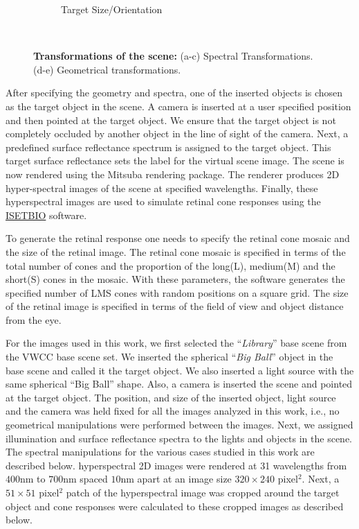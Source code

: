 \documentclass{jov}
\begin{document}
\begin{figure}
\begin{subfigure}[b]{0.18 \textwidth}
        \caption{Target Size/Orientation}
        \label{fig:targetSizeOrientation}
    \end{subfigure}
    ~ %
    \caption{{\bf Transformations of the scene:} (a-c) Spectral Transformations. (d-e) Geometrical transformations.}\label{fig:spectralTransformations}
\end{figure}

After specifying the geometry and spectra, one of the inserted objects is chosen as the target object in the scene. A camera is inserted at a user specified position and then pointed at the target object. We ensure that the target object is not completely occluded by another object in the line of sight of the camera. Next, a predefined surface reflectance spectrum is assigned to the target object. This target surface reflectance sets the label for the virtual scene image. The scene is now rendered using the Mitsuba rendering package. The renderer produces 2D hyper-spectral images of the scene at specified wavelengths. Finally, these hyperspectral images are used to simulate retinal cone responses using the \href{https://github.com/isetbio}{ISETBIO} software.

To generate the retinal response one needs to specify the retinal cone mosaic and the size of the retinal image. The retinal cone mosaic is specified in terms of the total number of cones and the proportion of the long(L), medium(M) and the short(S) cones in the mosaic. With these parameters, the software generates the specified number of LMS cones with random positions on a square grid. The size of the retinal image is specified in terms of the field of view and object distance from the eye. 

For the images used in this work, we first selected the ``{\it Library}'' base scene from the VWCC base scene set. We inserted the spherical ``{\it Big Ball}'' object in the base scene and called it the target object. We also inserted a light source with the same spherical ``Big Ball'' shape. Also, a camera is inserted the scene and pointed at the target object. The position, and size of the inserted object, light source and the camera was held fixed for all the images analyzed in this work, i.e., no geometrical manipulations were performed between the images. Next, we assigned illumination and surface reflectance spectra to the lights and objects in the scene. The spectral manipulations for the various cases studied in this work are described below. hyperspectral 2D images were rendered at 31 wavelengths from $400$nm to $700$nm spaced $10$nm apart at an image size $320\times 240$ pixel$^2$. Next, a $51 \times 51$ pixel$^2$ patch of the hyperspectral image was cropped around the target object and cone responses were calculated to these cropped images as described below.
\end{document}
